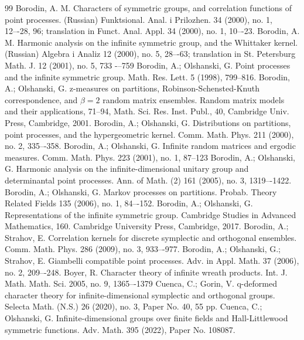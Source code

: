 \documentclass[12pt]{amsart}
\theoremstyle{definition}
\numberwithin{equation}{section}
\begin{document}
\begin{thebibliography}{99}
 Borodin, A. M. Characters of symmetric groups, and correlation functions of point processes. (Russian) Funktsional. Anal. i Prilozhen. 34 (2000), no. 1, 12–-28, 96; translation in Funct. Anal. Appl. 34 (2000), no. 1, 10–-23.
  Borodin, A. M. Harmonic analysis on the infinite symmetric group, and the Whittaker kernel. (Russian) Algebra i Analiz 12 (2000), no. 5, 28–-63; translation in St. Petersburg Math. J. 12 (2001), no. 5, 733
  -–759
 Borodin, A.; Olshanski, G. Point processes and the infinite symmetric group. Math. Res. Lett. 5 (1998), 799--816.
 Borodin, A.; Olshanski, G. z-measures on partitions, Robinson-Schensted-Knuth correspondence, and $\beta=2$ random matrix ensembles. Random matrix models and their applications, 71–94, Math. Sci. Res. Inst. Publ., 40, Cambridge Univ. Press, Cambridge, 2001.
 Borodin, A.; Olshanski, G. Distributions on partitions, point processes, and the hypergeometric kernel. Comm. Math. Phys. 211 (2000), no. 2, 335–-358.
 Borodin, A.; Olshanski, G. Infinite random matrices and ergodic measures. Comm. Math. Phys. 223 (2001), no. 1, 87–123
 Borodin, A.; Olshanski, G. Harmonic analysis on the infinite-dimensional unitary group and determinantal point processes. Ann. of Math. (2) 161 (2005), no. 3, 1319–-1422.
Borodin, A.; Olshanski, G. Markov processes on partitions. Probab. Theory Related Fields 135 (2006), no. 1, 84–-152.
Borodin, A.; Olshanski, G. Representations of the infinite symmetric group. Cambridge Studies in Advanced Mathematics, 160. Cambridge University Press, Cambridge, 2017.
Borodin, A.; Strahov, E. Correlation kernels for discrete symplectic and orthogonal ensembles. Comm. Math. Phys. 286 (2009), no. 3, 933–-977.
 Borodin, A.; Olshanski, G.; Strahov, E. Giambelli compatible point processes. Adv. in Appl. Math. 37 (2006), no. 2, 209–-248.
Boyer, R.
Character theory of infinite wreath products.
Int. J. Math. Math. Sci. 2005, no. 9, 1365–-1379
 Cuenca, C.; Gorin, V. q-deformed character theory for infinite-dimensional symplectic and orthogonal groups. Selecta Math. (N.S.) 26 (2020), no. 3, Paper No. 40, 55 pp.
 Cuenca, C.; Olshanski, G. Infinite-dimensional groups over finite fields and Hall-Littlewood symmetric functions. Adv. Math. 395 (2022), Paper No. 108087.

\end{thebibliography}
\end{document}
